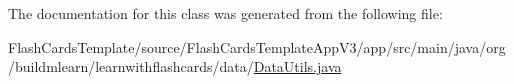 The documentation for this class was generated from the following file\+:\begin{DoxyCompactItemize}
\item 
Flash\+Cards\+Template/source/\+Flash\+Cards\+Template\+App\+V3/app/src/main/java/org/buildmlearn/learnwithflashcards/data/\hyperlink{FlashCardsTemplate_2source_2FlashCardsTemplateAppV3_2app_2src_2main_2java_2org_2buildmlearn_2lead72dd80b0dee0cb1129f55d2c9ae1e8a}{Data\+Utils.\+java}\end{DoxyCompactItemize}
